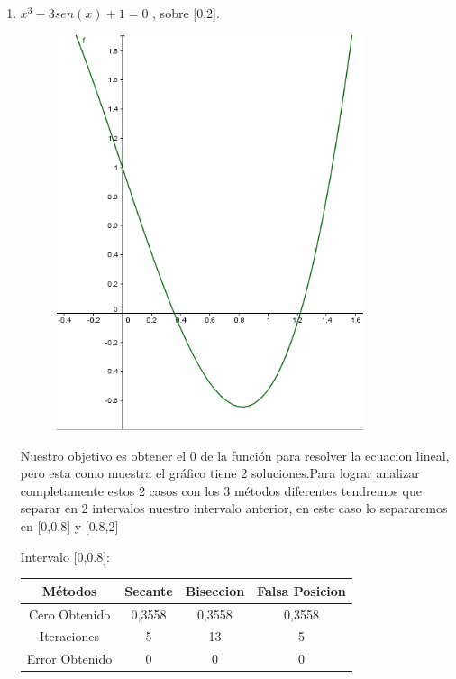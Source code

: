 \documentclass{udparticle}
\begin{document}
\begin{enumerate}
\begin{enumerate}
\item  \(x^3 - 3sen(x) +1 = 0\) , sobre [0,2].
\begin{figure}[H]
    \centering
    \includegraphics[width=9cm]{GraficoEj1a}
\end{figure}
Nuestro objetivo es obtener el 0 de la función para resolver la ecuacion lineal, pero esta como muestra el gráfico tiene 2 soluciones.Para lograr analizar completamente estos 2 casos con los 3 métodos diferentes tendremos que separar en 2 intervalos nuestro intervalo anterior, en este caso lo separaremos en [0,0.8] y [0.8,2]\\
    \begin{table}[H]Intervalo [0,0.8]:
    \centering
        \begin{tabular} { |c|c|c|c|}
        \hline
        Métodos       & Secante & Biseccion & Falsa Posicion  \\
        \hline
        Cero Obtenido &  0,3558       &    0,3558       &      0,3558    \\
        \hline
        Iteraciones   &     5        &      13     &        5          \\
        \hline
        Error Obtenido &       0      &       0      &     0         \\
         \hline
        \end{tabular}
    \end{table}


\end{enumerate}
\end{enumerate}
\end{document}
